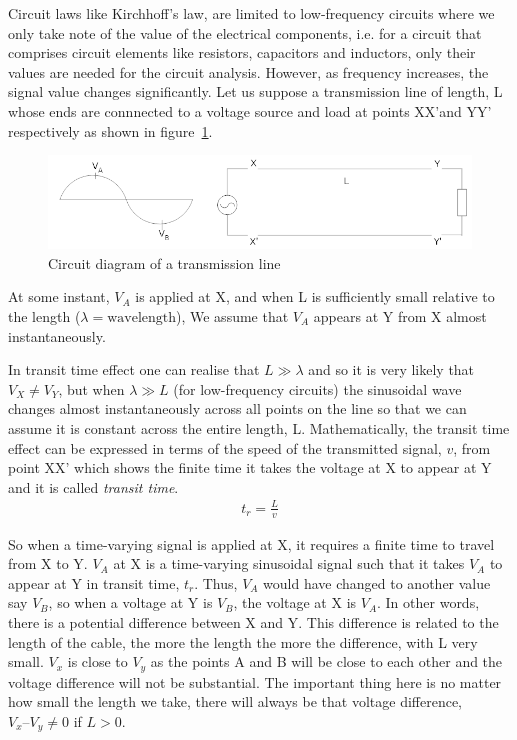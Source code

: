 Circuit laws like Kirchhoff’s law, are limited to low-frequency circuits where we only take note of the value of the electrical components, i.e. for a circuit that comprises circuit elements like resistors, capacitors and inductors, only their values are needed for the circuit analysis. However, as frequency increases, the signal value changes significantly. Let us suppose a transmission line of length, L whose ends are connnected to a voltage source and load at points XX'and YY' respectively as shown in figure~\ref{fig:first}.
\begin{figure}[h]
\centering
\includegraphics[width=1\linewidth]{./graphics/first}
\caption{Circuit diagram of a transmission line}
\label{fig:first}
\end{figure}

At some instant, $ V_{A} $ is applied at X, and when L is sufficiently small relative to the length ($  \lambda = \text{wavelength} $), We assume that $ V_{A} $ appears at Y from X almost instantaneously.

In transit time effect one can realise that $ L \gg\lambda$ and so it is very likely that $ V_{X} \neq V_{Y} $, but when $  \lambda \gg L  $ (for low-frequency circuits) the sinusoidal wave changes almost instantaneously across all points on the line so that we can assume it is constant across the entire length, L. Mathematically, the transit time effect can be expressed in terms of the speed of the transmitted signal, $v$, from point XX' which shows the finite time it takes the voltage at X to appear at Y and it is called \textit{transit time}.
\begin{align}
t_{r} = \frac{L}{v}
\label{eqn:transittime}
\end{align}

So when a time-varying signal is applied at X, it requires a finite time to travel from X to Y. $ V_{A} $ at X is a time-varying sinusoidal signal such that it takes $ V_{A} $ to appear at Y in transit time, $t_r$. Thus, $ V_{A} $ would have changed to another value say $ V_{B} $, so when a voltage at Y is $ V_{B} $, the voltage at X is $ V_{A} $. In other words, there is a potential difference between X and Y. This difference is related to the length of the cable, the more the length the more the difference, with L very small. $ V_{x} $ is close to $ V_{y} $ as the points A and B will be close to each other and the voltage difference will not be substantial. The important thing here is no matter how small the length we take, there will always be that voltage difference, $ V_{x} – V_{y} \neq 0 $ if $ L > 0 $.

